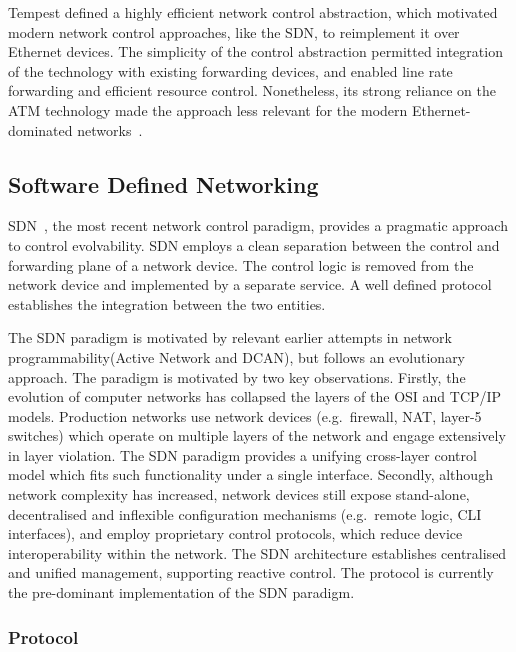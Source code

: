 Tempest defined a highly efficient network control abstraction, which motivated
modern network control approaches, like the SDN, to reimplement it over Ethernet
devices.  The simplicity of the control abstraction permitted
integration of the technology with existing forwarding devices, and enabled line
rate forwarding and efficient resource control.  Nonetheless, its strong
reliance on the ATM technology made the approach less relevant for the modern
Ethernet-dominated networks~. 

\subsection{Software Defined Networking}\label{sec:background:sdn} 

SDN~, the most recent network control paradigm, provides a pragmatic
approach to control evolvability. SDN employs  a clean separation between the
control and forwarding plane of a network device. The control logic is
removed from the network device and implemented by a separate service.  A well
defined protocol establishes the integration between the two entities. 

The SDN paradigm is motivated by relevant earlier attempts in network
programmability(Active Network and DCAN), but follows an evolutionary approach.
The paradigm is motivated by two key observations.  Firstly, the evolution of
computer networks has collapsed the layers of the OSI and TCP/IP models.
Production networks use network devices (e.g.~firewall, NAT, layer-5 switches)
which operate on multiple layers of the network and engage extensively in layer
violation.  The SDN paradigm provides a unifying cross-layer control model which
fits such functionality under a single interface.  Secondly, although network
complexity has increased, network devices still expose stand-alone,
decentralised and inflexible configuration mechanisms (e.g.~remote logic, CLI
interfaces), and employ proprietary control protocols, which reduce device
interoperability within the network. The SDN architecture establishes
centralised and unified management, supporting reactive control.  The \of
protocol is currently the pre-dominant implementation of the SDN paradigm.

\subsubsection*{\of Protocol} 

